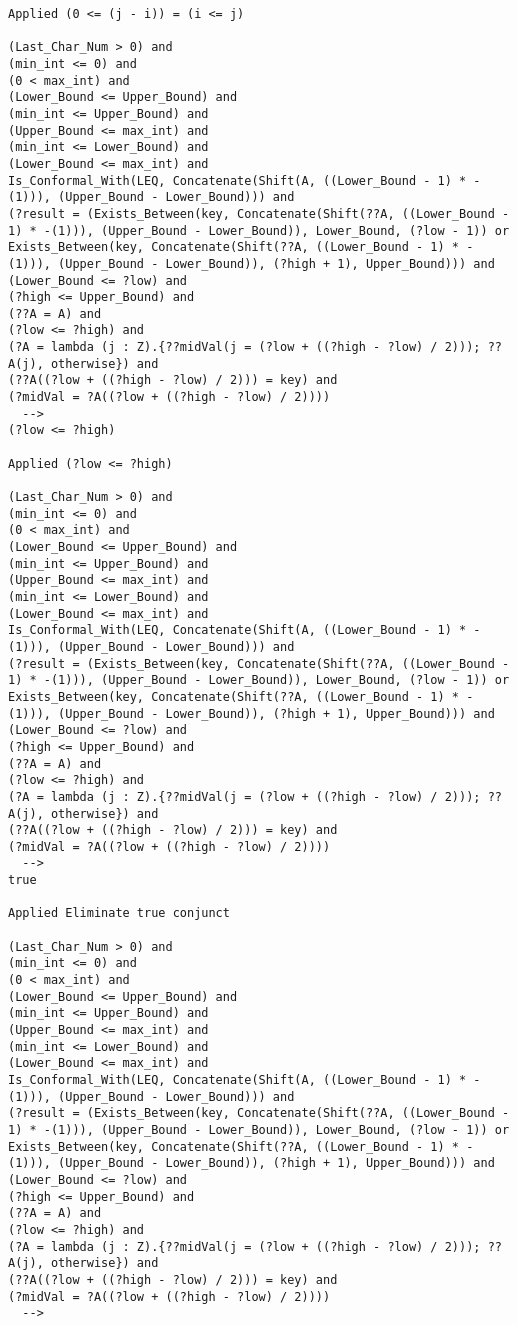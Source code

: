 \begin{lstlisting}[language=resolve]
Applied (0 <= (j - i)) = (i <= j)

(Last_Char_Num > 0) and
(min_int <= 0) and
(0 < max_int) and
(Lower_Bound <= Upper_Bound) and
(min_int <= Upper_Bound) and
(Upper_Bound <= max_int) and
(min_int <= Lower_Bound) and
(Lower_Bound <= max_int) and
Is_Conformal_With(LEQ, Concatenate(Shift(A, ((Lower_Bound - 1) * -(1))), (Upper_Bound - Lower_Bound))) and
(?result = (Exists_Between(key, Concatenate(Shift(??A, ((Lower_Bound - 1) * -(1))), (Upper_Bound - Lower_Bound)), Lower_Bound, (?low - 1)) or Exists_Between(key, Concatenate(Shift(??A, ((Lower_Bound - 1) * -(1))), (Upper_Bound - Lower_Bound)), (?high + 1), Upper_Bound))) and
(Lower_Bound <= ?low) and
(?high <= Upper_Bound) and
(??A = A) and
(?low <= ?high) and
(?A = lambda (j : Z).{??midVal(j = (?low + ((?high - ?low) / 2))); ??A(j), otherwise}) and
(??A((?low + ((?high - ?low) / 2))) = key) and
(?midVal = ?A((?low + ((?high - ?low) / 2))))
  -->
(?low <= ?high)

Applied (?low <= ?high)

(Last_Char_Num > 0) and
(min_int <= 0) and
(0 < max_int) and
(Lower_Bound <= Upper_Bound) and
(min_int <= Upper_Bound) and
(Upper_Bound <= max_int) and
(min_int <= Lower_Bound) and
(Lower_Bound <= max_int) and
Is_Conformal_With(LEQ, Concatenate(Shift(A, ((Lower_Bound - 1) * -(1))), (Upper_Bound - Lower_Bound))) and
(?result = (Exists_Between(key, Concatenate(Shift(??A, ((Lower_Bound - 1) * -(1))), (Upper_Bound - Lower_Bound)), Lower_Bound, (?low - 1)) or Exists_Between(key, Concatenate(Shift(??A, ((Lower_Bound - 1) * -(1))), (Upper_Bound - Lower_Bound)), (?high + 1), Upper_Bound))) and
(Lower_Bound <= ?low) and
(?high <= Upper_Bound) and
(??A = A) and
(?low <= ?high) and
(?A = lambda (j : Z).{??midVal(j = (?low + ((?high - ?low) / 2))); ??A(j), otherwise}) and
(??A((?low + ((?high - ?low) / 2))) = key) and
(?midVal = ?A((?low + ((?high - ?low) / 2))))
  -->
true

Applied Eliminate true conjunct

(Last_Char_Num > 0) and
(min_int <= 0) and
(0 < max_int) and
(Lower_Bound <= Upper_Bound) and
(min_int <= Upper_Bound) and
(Upper_Bound <= max_int) and
(min_int <= Lower_Bound) and
(Lower_Bound <= max_int) and
Is_Conformal_With(LEQ, Concatenate(Shift(A, ((Lower_Bound - 1) * -(1))), (Upper_Bound - Lower_Bound))) and
(?result = (Exists_Between(key, Concatenate(Shift(??A, ((Lower_Bound - 1) * -(1))), (Upper_Bound - Lower_Bound)), Lower_Bound, (?low - 1)) or Exists_Between(key, Concatenate(Shift(??A, ((Lower_Bound - 1) * -(1))), (Upper_Bound - Lower_Bound)), (?high + 1), Upper_Bound))) and
(Lower_Bound <= ?low) and
(?high <= Upper_Bound) and
(??A = A) and
(?low <= ?high) and
(?A = lambda (j : Z).{??midVal(j = (?low + ((?high - ?low) / 2))); ??A(j), otherwise}) and
(??A((?low + ((?high - ?low) / 2))) = key) and
(?midVal = ?A((?low + ((?high - ?low) / 2))))
  -->



\end{lstlisting}

